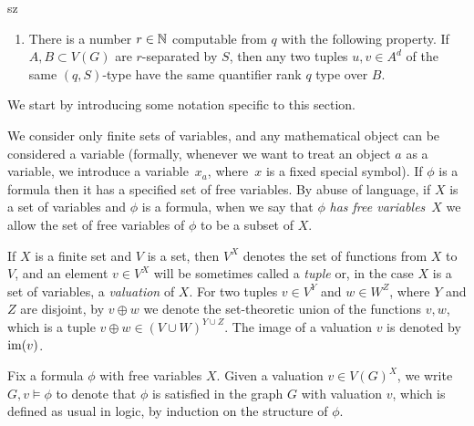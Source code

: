 \begin{change}{sz}
\begin{lemma}
\begin{enumerate}[(1)]
		
	 	\item\label{c:confusing}
		 	  There is a number 
		 $r\in\mathbb{N}$ computable from $q$ with the following property. 
		 If $A,B\subset V(G)$ are 
 $r$-separated by $S$,
then any two tuples $u,v\in A^d$
		 of the same $(q,S)$-type
have
		 the same  quantifier rank $q$ type
		 over $B$.
	 \end{enumerate}
\end{lemma}
We start by introducing some notation specific to this section.

We consider only finite sets of variables, and any mathematical object can be considered a variable 
(formally, whenever we want to treat an object $a$ as a variable, we introduce a variable~$x_a$, where~$x$ is a fixed special symbol).
If $\phi$ is a formula then it has a specified set of free variables.
By abuse of language, if $X$ is a set of variables and $\phi$
is a formula, when we say that $\phi$ \emph{has free variables}~$X$
we allow the set of free variables of $\phi$ to be a subset of $X$.

If $X$ is a finite set and $V$ is a set, then $V^X$ denotes the set of functions from $X$ to $V$, and an element $v\in V^X$ will be sometimes called a \emph{tuple} 
or, in the case $X$ is a set of variables, a \emph{valuation} of $X$.
For two tuples
$v\in V^Y$ and $w\in  W^Z$, where $Y$ and $Z$ are disjoint, by
$v\oplus w$ we denote the set-theoretic union of the functions $v,w$,
which is a tuple $v\oplus w\in (V\cup W)^{Y\cup Z}$.
The image of a valuation $v$ is denoted by $\mathrm{im}(v)$.




Fix a formula $\phi$ with free variables $X$.
Given a valuation $v\in V(G)^X$, we write $G,v\models \phi$ to denote that $\phi$ is satisfied 
in the graph $G$ with valuation $v$, which is defined as usual in logic, by induction on the structure of $\phi$.


\end{change}


